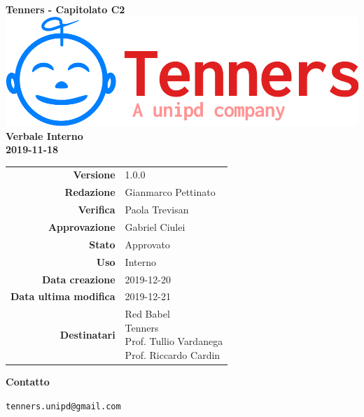 \begin{titlepage}
	\begin{center}
		\large \textbf{Tenners - Capitolato C2}
		\vfill
		\includegraphics[scale = 0.3]{./res/img/logo.png}\\
		\vfill
		\Huge \textbf{Verbale Interno} \\
		\textbf {2019-11-18}

        \vfill
        \large

        \begin{tabular}{r|l}
                        \textbf{Versione} & 1.0.0 \\
                        \textbf{Redazione} & Gianmarco Pettinato \\
                        \textbf{Verifica} &  Paola Trevisan \\
                        \textbf{Approvazione} & Gabriel Ciulei \\
                        \textbf{Stato} & Approvato \\
                        \textbf{Uso} &  Interno\\
                        \textbf{Data creazione} &  2019-12-20\\
                        \textbf{Data ultima modifica} & 2019-12-21 \\
                        \textbf{Destinatari} & \parbox[t]{5cm}{Red Babel\\Tenners \\ Prof. Tullio Vardanega\\ Prof. Riccardo Cardin}
                \end{tabular}
                \vfill
                \normalsize
                \vfill
                \textbf{Contatto}

                \texttt{tenners.unipd@gmail.com}

	\end{center}
\end{titlepage}
